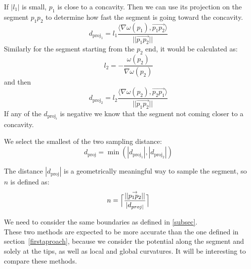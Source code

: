 \documentclass[11pt,a4paper]{article}
\newcommand{\gvec}[1]{\ensuremath{\overset{\rightarrow}{#1}}}
\newcommand{\scal}[2]{\ensuremath{\langle #1 , #2 \rangle}}
\begin{document}
If $|l_1|$ is small, $p_1$ is close to a concavity. 
Then we can use its projection on the segment $p_1p_2$ to determine how fast the segment is going toward the concavity.
\begin{equation}
 d_{\text{proj}_1} = l_1 \frac{\scal{\nabla \omega(p_1)}{ \gvec{p_1p_2}}}{||\gvec{p_1p_2}||} 
\end{equation}
Similarly for the segment starting from the $p_2$ end, it would be calculated  as:
\begin{equation}
l_2 = -\frac{\omega(p_2)}{\nabla\omega(p_2)}
\end{equation}
and then
\begin{equation}
 d_{\text{proj}_2} = l_2 \frac{\scal{\nabla \omega(p_2)}{\gvec{p_2p_1}}}{||\gvec{p_1p_2}||}
\end{equation}
If any of the $d_{\text{proj}_i}$ is negative we know that the segment not coming closer to a concavity.

We select the smallest of the two sampling distance:
\begin{equation}
d_{\text{proj}} = \min(|d_{\text{proj}_1}|,|d_{\text{proj}_2}|)
\end{equation}

The distance $|d_{\text{proj}}|$ is a geometrically meaningful way to sample the segment, so $n$ is defined as:
\begin{equation}
n = \Bigl\lceil\frac{||\gvec{p_1p_2}||}{|d_{proj|}}\Bigr\rceil
\end{equation}

We need to consider the same boundaries as defined in \ref{subsec}.\\




These two methods are expected to be more accurate than the one defined in section~\ref{firstaproach}, because we consider the potential along the segment and solely at the tips, as well as local and global curvatures. It will be interesting to compare these methods.




	
\end{document}
